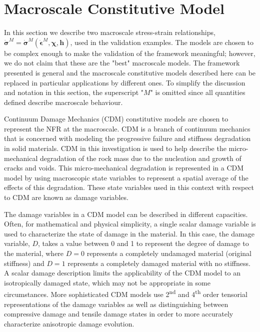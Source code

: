 \section{Macroscale Constitutive Model}

In this section we describe two macroscale stress-strain relationships, $\dot{\boldsymbol{\sigma}}^M=\dot{\boldsymbol{\sigma}}^M\left(\dot{\boldsymbol{\epsilon}}^M, \boldsymbol{\chi},\mathbf{h}\right)$, used in the validation examples. The models are chosen to be complex enough to make the validation of the framework meaningful; however, we do not claim that these are the "best" macroscale models. The framework presented is general and the macroscale constitutive models described here can be replaced in particular applications by different ones. To simplify the discussion and notation in this section, the superscript "$M$" is omitted since all quantities defined describe macroscale behaviour.

Continuum Damage Mechanics (CDM) constitutive models are chosen to represent the NFR at the macroscale. CDM is a branch of continuum mechanics that is concerned with modeling the progressive failure and stiffness degradation in solid materials. CDM in this investigation is used to help describe the micro-mechanical degradation of the rock mass due to the nucleation and growth of cracks and voids. This micro-mechanical degradation is represented in a CDM model by using macroscopic state variables to represent a spatial average of the effects of this degradation. These state variables used in this context with respect to CDM are known as damage variables. 

The damage variables in a CDM model can be described in different capacities. Often, for mathematical and physical simplicity, a single scalar damage variable is used to characterize the state of damage in the material. In this case, the damage variable, $D$, takes a value between 0 and 1 to represent the degree of damage to the material, where $D=0$ represents a completely undamaged material (original stiffness) and $D=1$ represents a completely damaged material with no stiffness. A scalar damage description limits the applicability of the CDM model to an isotropically damaged state, which may not be appropriate in some circumstances. More sophisticated CDM models use 2\textsuperscript{nd} and 4\textsuperscript{th} order tensorial representations of the damage variables as well as distinguishing between compressive damage and tensile damage states in order to more accurately characterize anisotropic damage evolution. 

